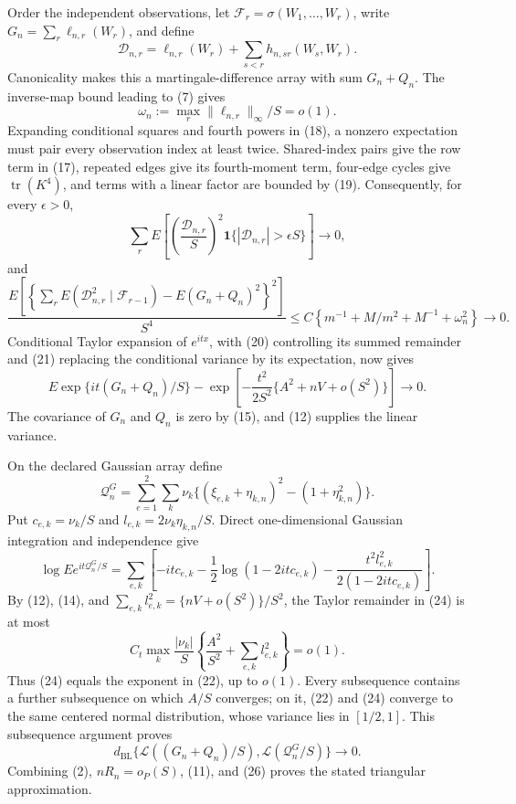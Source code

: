 Order the independent observations, let \(\mathcal F_r=\sigma(W_1,\ldots,W_r)\), write \(G_n=\sum_r\ell_{n,r}(W_r)\), and define
\[
\mathcal D_{n,r}=\ell_{n,r}(W_r)+\sum_{s<r}h_{n,sr}(W_s,W_r).              \tag{18}
\]
Canonicality makes this a martingale-difference array with sum \(G_n+Q_n\).  The inverse-map bound leading to (7) gives
\[
\omega_n:=\max_r\|\ell_{n,r}\|_\infty/S=o(1).                           \tag{19}
\]
Expanding conditional squares and fourth powers in (18), a nonzero expectation must pair every observation index at least twice.  Shared-index pairs give the row term in (17), repeated edges give its fourth-moment term, four-edge cycles give \(\operatorname{tr}(K^4)\), and terms with a linear factor are bounded by (19).  Consequently, for every \(\epsilon>0\),
\[
\sum_rE\left[\left(\frac{\mathcal D_{n,r}}S\right)^2
\mathbf1\{|\mathcal D_{n,r}|>\epsilon S\}\right]\to0,                  \tag{20}
\]
and
\[
\frac{E\left[\left\{\sum_rE(\mathcal D_{n,r}^2\mid\mathcal F_{r-1})
-E(G_n+Q_n)^2\right\}^2\right]}{S^4}
\le C\left\{m^{-1}+M/m^2+M^{-1}+\omega_n^2\right\}\to0.                \tag{21}
\]
Conditional Taylor expansion of \(e^{itx}\), with (20) controlling its summed remainder and (21) replacing the conditional variance by its expectation, now gives
\[
E\exp\{it(G_n+Q_n)/S\}
-\exp\left[-\frac{t^2}{2S^2}\{A^2+nV+o(S^2)\}\right]\to0.              \tag{22}
\]
The covariance of \(G_n\) and \(Q_n\) is zero by (15), and (12) supplies the linear variance.

On the declared Gaussian array define
\[
\mathcal Q_n^G=\sum_{e=1}^2\sum_k\nu_k
\{(\xi_{e,k}+\eta_{k,n})^2-(1+\eta_{k,n}^2)\}.                           \tag{23}
\]
Put \(c_{e,k}=\nu_k/S\) and \(l_{e,k}=2\nu_k\eta_{k,n}/S\).  Direct one-dimensional Gaussian integration and independence give
\[
\log E e^{it\mathcal Q_n^G/S}
=\sum_{e,k}\left[-itc_{e,k}-\frac12\log(1-2itc_{e,k})
-\frac{t^2l_{e,k}^2}{2(1-2itc_{e,k})}\right].                             \tag{24}
\]
By (12), (14), and \(\sum_{e,k}l_{e,k}^2=\{nV+o(S^2)\}/S^2\), the Taylor remainder in (24) is at most
\[
C_t\max_k\frac{|\nu_k|}{S}
\left\{\frac{A^2}{S^2}+\sum_{e,k}l_{e,k}^2\right\}=o(1).                \tag{25}
\]
Thus (24) equals the exponent in (22), up to \(o(1)\).  Every subsequence contains a further subsequence on which \(A/S\) converges; on it, (22) and (24) converge to the same centered normal distribution, whose variance lies in \([1/2,1]\).  This subsequence argument proves
\[
d_{\mathrm{BL}}\{\mathcal L((G_n+Q_n)/S),
\mathcal L(\mathcal Q_n^G/S)\}\to0.                                     \tag{26}
\]
Combining (2), \(nR_n=o_P(S)\), (11), and (26) proves the stated triangular approximation.

